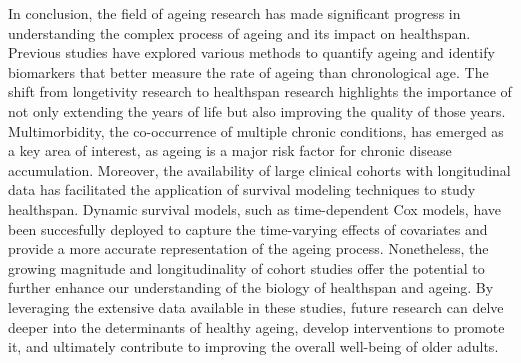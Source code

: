 In conclusion, the field of ageing research has made significant progress in understanding the complex process of ageing and its impact on healthspan. Previous studies have explored various methods to quantify ageing and identify biomarkers that better measure the rate of ageing than chronological age. The shift from longetivity research to healthspan research highlights the importance of not only extending the years of life but also improving the quality of those years. Multimorbidity, the co-occurrence of multiple chronic conditions, has emerged as a key area of interest, as ageing is a major risk factor for chronic disease accumulation. Moreover, the availability of large clinical cohorts with longitudinal data has facilitated the application of survival modeling techniques to study healthspan. Dynamic survival models, such as time-dependent Cox models, have been succesfully deployed to capture the time-varying effects of covariates and provide a more accurate representation of the ageing process. Nonetheless, the growing magnitude and longitudinality of cohort studies offer the potential to further enhance our understanding of the biology of healthspan and ageing. By leveraging the extensive data available in these studies, future research can delve deeper into the determinants of healthy ageing, develop interventions to promote it, and ultimately contribute to improving the overall well-being of older adults.
